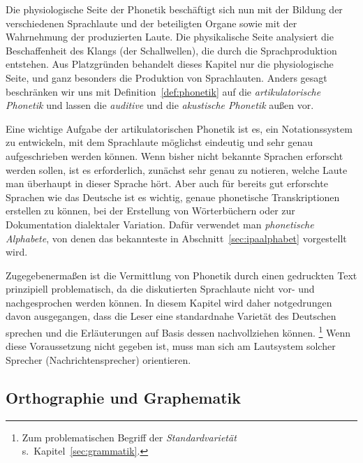 Die physiologische Seite der Phonetik beschäftigt sich nun mit der Bildung der verschiedenen Sprachlaute und der beteiligten Organe sowie mit der Wahrnehmung der produzierten Laute.
Die physikalische Seite analysiert die Beschaffenheit des Klangs (der Schallwellen), die durch die Sprachproduktion entstehen.
Aus Platzgründen behandelt dieses Kapitel nur die physiologische Seite, und ganz besonders die Produktion von Sprachlauten.
Anders gesagt beschränken wir uns mit Definition~\ref{def:phonetik} auf die \textit{artikulatorische Phonetik} und lassen die \textit{auditive} und die \textit{akustische Phonetik} außen vor.


Eine wichtige Aufgabe der artikulatorischen Phonetik ist es, ein Notationssystem zu entwickeln, mit dem Sprachlaute möglichst eindeutig und sehr genau aufgeschrieben werden können.
Wenn bisher nicht bekannte Sprachen erforscht werden sollen, ist es \zB erforderlich, zunächst sehr genau zu notieren, welche Laute man überhaupt in dieser Sprache hört.
Aber auch für bereits gut erforschte Sprachen wie das Deutsche ist es wichtig, genaue phonetische Transkriptionen erstellen zu können, \zB bei der Erstellung von Wörterbüchern oder zur Dokumentation dialektaler Variation.
Dafür verwendet man \textit{phonetische Alphabete}, von denen das bekannteste in Abschnitt~\ref{sec:ipaalphabet} vorgestellt wird.

Zugegebenermaßen ist die Vermittlung von Phonetik durch einen gedruckten Text prinzipiell problematisch, da die diskutierten Sprachlaute nicht vor- und nachgesprochen werden können.
In diesem Kapitel wird daher notgedrungen davon ausgegangen, dass die Leser eine standardnahe Varietät des Deutschen sprechen und die Erläuterungen auf Basis dessen nachvollziehen können.%
\footnote{Zum problematischen Begriff der \textit{Standardvarietät} s.\ Kapitel~\ref{sec:grammatik}.}
Wenn diese Voraussetzung nicht gegeben ist, muss man sich am Lautsystem solcher Sprecher (\zB Nachrichtensprecher) orientieren.

\Enl

\subsection{Orthographie und Graphematik}

